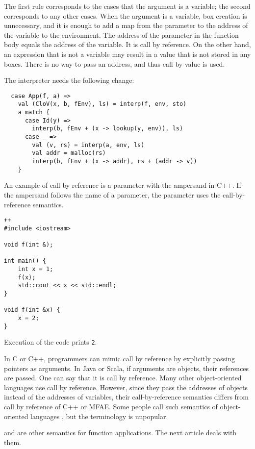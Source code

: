 The first rule corresponds to the cases that the argument is a variable; the second corresponds to any other cases. When the argument is a variable, box creation is unnecessary, and it is enough to add a map from the parameter to the address of the variable to the environment. The address of the parameter in the function body equals the address of the variable. It is call by reference. On the other hand, an expression that is not a variable may result in a value that is not stored in any boxes. There is no way to pass an address, and thus call by value is used.

The interpreter needs the following change:

\begin{verbatim}
  case App(f, a) =>
    val (CloV(x, b, fEnv), ls) = interp(f, env, sto)
    a match {
      case Id(y) =>
        interp(b, fEnv + (x -> lookup(y, env)), ls)
      case _ =>
        val (v, rs) = interp(a, env, ls)
        val addr = malloc(rs)
        interp(b, fEnv + (x -> addr), rs + (addr -> v))
    }
\end{verbatim}

An example of call by reference is a parameter with the ampersand in C++. If the ampersand follows the name of a parameter, the parameter uses the call-by-reference semantics.

\begin{verbatim}++
#include <iostream>

void f(int &);

int main() {
    int x = 1;
    f(x);
    std::cout << x << std::endl;
}

void f(int &x) {
    x = 2;
}
\end{verbatim}

Execution of the code prints \verb!2!.

In C or C++, programmers can mimic call by reference by explicitly passing pointers as arguments. In Java or Scala, if arguments are objects, their references are passed. One can say that it is call by reference. Many other object-oriented languages use call by reference. However, since they pass the addresses of objects instead of the addresses of variables, their call-by-reference semantics differs from call by reference of C++ or MFAE. Some people call such semantics of object-oriented languages , but the terminology is unpopular.

 and  are other semantics for function applications. The next article deals with them.
